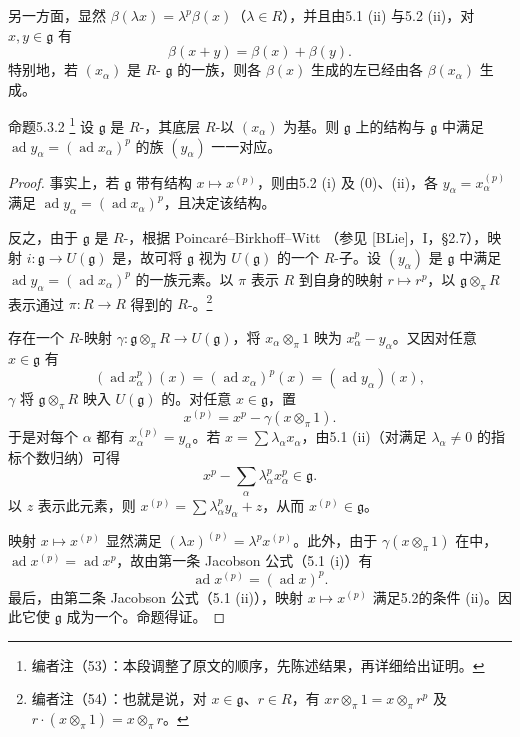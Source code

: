另一方面，显然 $\beta(\lambda x)=\lambda^p\beta(x)$（$\lambda\in R$），并且由5.1 (ii) 与5.2 (ii)，对 $x,y\in\mathfrak g$ 有
\[
 \beta(x+y)=\beta(x)+\beta(y).
\]
特别地，若 $(x_\alpha)$ 是 $R$- $\mathfrak g$ 的一族，则各 $\beta(x)$ 生成的左已经由各 $\beta(x_\alpha)$ 生成。

\begin{SGAresult}{命题}{5.3.2}
\footnote{编者注（53）：本段调整了原文的顺序，先陈述结果，再详细给出证明。}
设 $\mathfrak g$ 是 $R$-，其底层 $R$-以 $(x_\alpha)$ 为基。则 $\mathfrak g$ 上的结构与 $\mathfrak g$ 中满足 $\operatorname{ad}y_\alpha=(\operatorname{ad}x_\alpha)^p$ 的族 $(y_\alpha)$ 一一对应。
\end{SGAresult}
\begin{proof}
事实上，若 $\mathfrak g$ 带有结构 $x\mapsto x^{(p)}$，则由5.2 (i) 及 (0)、(ii)，各 $y_\alpha=x_\alpha^{(p)}$ 满足 $\operatorname{ad}y_\alpha=(\operatorname{ad}x_\alpha)^p$，且决定该结构。

反之，由于 $\mathfrak g$ 是 $R$-，根据 Poincaré--Birkhoff--Witt （参见 [BLie]，I，\S2.7），映射 $i:\mathfrak g\to U(\mathfrak g)$ 是，故可将 $\mathfrak g$ 视为 $U(\mathfrak g)$ 的一个 $R$-子。设 $(y_\alpha)$ 是 $\mathfrak g$ 中满足 $\operatorname{ad}y_\alpha=(\operatorname{ad}x_\alpha)^p$ 的一族元素。以 $\pi$ 表示 $R$ 到自身的映射 $r\mapsto r^p$，以 $\mathfrak g\otimes_\pi R$ 表示通过 $\pi:R\to R$ 得到的 $R$-。\footnote{编者注（54）：也就是说，对 $x\in\mathfrak g$、$r\in R$，有 $xr\otimes_\pi1=x\otimes_\pi r^p$ 及 $r\cdot(x\otimes_\pi1)=x\otimes_\pi r$。}

存在一个 $R$-映射 $\gamma:\mathfrak g\otimes_\pi R\to U(\mathfrak g)$，将 $x_\alpha\otimes_\pi1$ 映为 $x_\alpha^p-y_\alpha$。又因对任意 $x\in\mathfrak g$ 有
\[
 (\operatorname{ad}x_\alpha^p)(x)=(\operatorname{ad}x_\alpha)^p(x)
 =(\operatorname{ad}y_\alpha)(x),
\]
$\gamma$ 将 $\mathfrak g\otimes_\pi R$ 映入 $U(\mathfrak g)$ 的。对任意 $x\in\mathfrak g$，置
\[
 x^{(p)}=x^p-\gamma(x\otimes_\pi1).
\]
于是对每个 $\alpha$ 都有 $x_\alpha^{(p)}=y_\alpha$。若 $x=\sum\lambda_\alpha x_\alpha$，由5.1 (ii)（对满足 $\lambda_\alpha\ne0$ 的指标个数归纳）可得
\[
 x^p-\sum_\alpha\lambda_\alpha^px_\alpha^p\in\mathfrak g.
\]
以 $z$ 表示此元素，则 $x^{(p)}=\sum\lambda_\alpha^py_\alpha+z$，从而 $x^{(p)}\in\mathfrak g$。

映射 $x\mapsto x^{(p)}$ 显然满足 $(\lambda x)^{(p)}=\lambda^px^{(p)}$。此外，由于 $\gamma(x\otimes_\pi1)$ 在中，$\operatorname{ad}x^{(p)}=\operatorname{ad}x^p$，故由第一条 Jacobson 公式（5.1 (i)）有
\[
 \operatorname{ad}x^{(p)}=(\operatorname{ad}x)^p.
\]
最后，由第二条 Jacobson 公式（5.1 (ii)），映射 $x\mapsto x^{(p)}$ 满足5.2的条件 (ii)。因此它使 $\mathfrak g$ 成为一个。命题得证。
\end{proof}

